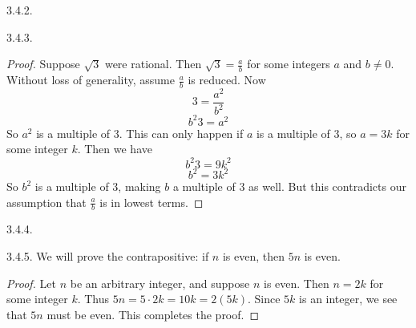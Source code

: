 \begin {itemize}
\begin{ans}{3.4.2.}
	
\end{ans}
\begin{ans}{3.4.3.}
     \begin{proof}
      Suppose $\sqrt{3}$ were rational.  Then $\sqrt{3} = \frac{a}{b}$ for some integers $a$ and $b \ne 0$.  Without loss of generality, assume $\frac{a}{b}$ is reduced.  Now
 \[3 = \frac{a^2}{b^2}\]
 \[b^2 3 = a^2\]
 So $a^2$ is a multiple of 3.  This can only happen if $a$ is a multiple of 3, so $a = 3k$ for some integer $k$.  Then we have
 \[b^2 3 = 9k^2\]
 \[b^2 = 3k^2\]
 So $b^2$ is a multiple of 3, making $b$ a multiple of 3 as well.  But this contradicts our assumption that $\frac{a}{b}$ is in lowest terms.
     \end{proof}
   
\end{ans}
\begin{ans}{3.4.4.}
	
\end{ans}
\begin{ans}{3.4.5.}
	We will prove the contrapositive: if $n$ is even, then $5n$ is even.
	  \begin{proof}
	    Let $n$ be an arbitrary integer, and suppose $n$ is even.  Then $n = 2k$ for some integer $k$.  Thus $5n = 5\cdot 2k = 10k = 2(5k)$.  Since $5k$ is an integer, we see that $5n$ must be even.  This completes the proof.
	  \end{proof}


\end{ans}
\end{itemize}
